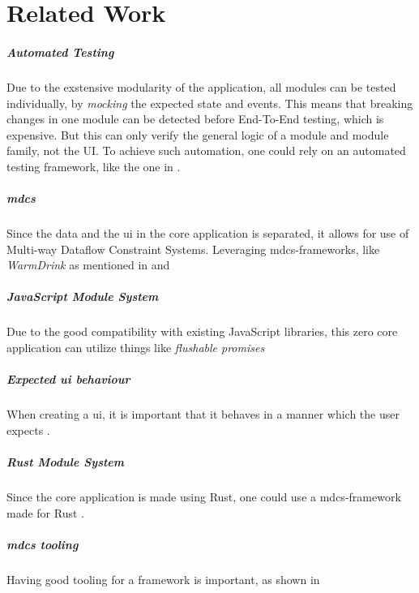 \chapter{Related Work} \label{cha:related}

\paragraph{Automated Testing} Due to the exstensive modularity of the
application, all modules can be tested individually, by \textit{mocking} the
expected state and events. This means that breaking changes in one module can be
detected before End-To-End testing, which is expensive. 
But this can only verify the general logic of a module and module family, not
the UI. To achieve such automation, one could rely on an automated testing
framework, like the one in \cite{autoUi}.

\paragraph{\gls{mdcs}} Since the data and the \gls{ui}
in the core application is separated, it allows for use of Multi-way Dataflow
Constraint Systems. Leveraging \gls{mdcs}-frameworks, like \textit{WarmDrink} as
mentioned in \cite{declGui} and \cite{dslMdcs}

\paragraph{JavaScript Module System} Due to the good compatibility with existing
JavaScript libraries, this zero core application can utilize things like
\textit{flushable promises} \cite{flush}

\paragraph{Expected \gls{ui} behaviour} When creating a \gls{ui}, it is
important that it behaves in a manner which the user expects \cite{leastGui}.

\paragraph{Rust Module System} Since the core application is made using Rust,
one could use a \gls{mdcs}-framework made for Rust \cite{mcdsRust}.

\paragraph{\gls{mdcs} tooling} Having good tooling for a framework is important,
as shown in \cite{toolMcds}
